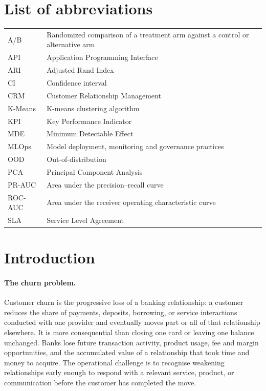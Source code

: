 \documentclass[a4paper,12pt]{article}
\begin{document}
\section*{List of abbreviations}
\begin{longtable}{p{}p{}}
A/B & Randomized comparison of a treatment arm against a control or alternative arm\\
API & Application Programming Interface\\
ARI & Adjusted Rand Index\\
CI & Confidence interval\\
CRM & Customer Relationship Management\\
K-Means & K-means clustering algorithm\\
KPI & Key Performance Indicator\\
MDE & Minimum Detectable Effect\\
MLOps & Model deployment, monitoring and governance practices\\
OOD & Out-of-distribution\\
PCA & Principal Component Analysis\\
PR-AUC & Area under the precision--recall curve\\
ROC-AUC & Area under the receiver operating characteristic curve\\
SLA & Service Level Agreement\\
\end{longtable}
\clearpage

\section{Introduction}

\paragraph*{The churn problem.}
Customer churn is the progressive loss of a banking relationship: a customer reduces the share of payments, deposits, borrowing, or service interactions conducted with one provider and eventually moves part or all of that relationship elsewhere. It is more consequential than closing one card or leaving one balance unchanged. Banks lose future transaction activity, product usage, fee and margin opportunities, and the accumulated value of a relationship that took time and money to acquire. The operational challenge is to recognise weakening relationships early enough to respond with a relevant service, product, or communication before the customer has completed the move.
\end{document}
